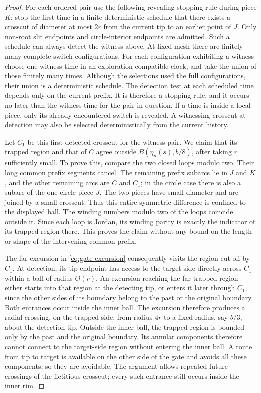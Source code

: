 \begin{proof}
For each ordered pair use the following revealing stopping rule
during piece $K$: stop the first time in a finite deterministic
schedule that there exists a crosscut of diameter at most $2r$
from the current tip to an earlier point of $J$.  Only non-root
slit endpoints and circle-interior endpoints are admitted.  Such
a schedule can always detect the witness above.  At fixed mesh
there are finitely many complete switch configurations.  For each
configuration exhibiting a witness choose one witness time in an
exploration-compatible clock, and take the union of those finitely
many times.  Although the selections used the full configurations,
their union is a deterministic schedule.  The detection test at
each scheduled time depends only on the current prefix.  It is
therefore a stopping rule, and it occurs no later than the witness
time for the pair in question.  If a time is inside a local piece,
only its already encountered switch is revealed.  A witnessing
crosscut at detection may also be selected deterministically from
the current history.

Let $C_1$ be this first detected crosscut for the witness pair.
We claim that its trapped region and that of $C$ agree outside
$B(\eta_n(s),b/8)$, after taking $r$ sufficiently small.  To prove
this, compare the two closed loops modulo two.  Their long common
prefix segments cancel.  The remaining prefix subarcs lie in $J$
and $K$, and the other remaining arcs are $C$ and $C_1$; in the
circle case there is also a subarc of the one circle piece $J$.
The two pieces have small diameter and are joined by a small
crosscut.  Thus this entire symmetric difference is confined to
the displayed ball.  The winding numbers modulo two of the loops
coincide outside it.  Since each loop is Jordan, its winding
parity is exactly the indicator of its trapped region there.
This proves the claim without any bound on the length or shape of
the intervening common prefix.

The far excursion in \eqref{eq:gate-excursion} consequently visits
the region cut off by $C_1$.  At detection, its tip endpoint has
access to the target side directly across $C_1$ within a ball of
radius $O(r)$.  An excursion reaching the far trapped region
either starts into that region at the detecting tip, or enters
it later through $C_1$, since the other sides of its boundary
belong to the past or the original boundary.  Both entrances
occur inside the inner ball.  The excursion therefore produces a
radial crossing, on the trapped side, from radius $4r$ to a fixed
radius, say $b/3$, about the detection tip.  Outside the inner
ball, the trapped region is bounded only by the past and the
original boundary.  Its annular components therefore cannot
connect to the target-side region without entering the inner
ball.  A route from tip to target is available on the other
side of the gate and avoids all these components, so they are
avoidable.  The argument allows repeated
future crossings of the fictitious crosscut; every such entrance
still occurs inside the inner rim.


\end{proof}
